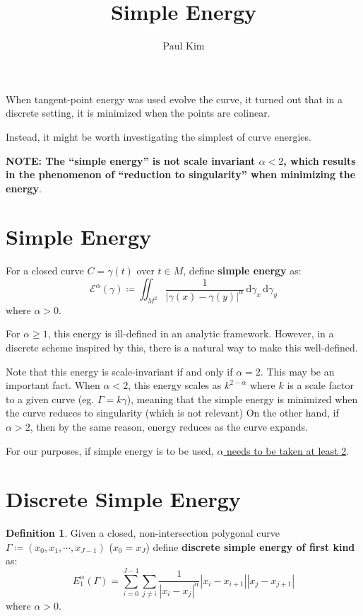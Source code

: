 \documentclass[a4paper]{article}
\title{Simple Energy}
\author{Paul Kim}
\newcommand{\dgamma}{\, \text{d}\gamma}
\theoremstyle{definition}
\newtheorem{definition}{Definition}
\begin{document}
\maketitle
When tangent-point energy was used evolve the curve, it turned out that in a discrete setting,
it is minimized when the points are colinear.

Instead, it might be worth investigating the simplest of curve energies.

\textbf{NOTE: The ``simple energy'' is not scale invariant $\alpha < 2$, which results in the phenomenon of ``reduction to singularity'' when minimizing the energy}.
\section{Simple Energy}
For a closed curve $C = \gamma(t)$ over $t \in M$, define \textbf{simple energy} as:
\begin{equation}
    \mathcal{E}^{\alpha} \left( \gamma \right) \coloneqq \iint_{M^2} \frac{1}{|\gamma(x) - \gamma(y)|^{\alpha}} \dgamma_x \dgamma_y
\end{equation}
where $\alpha > 0$.

For $\alpha \geq 1$, this energy is ill-defined in an analytic framework.
However, in a discrete scheme inspired by this, there is a natural way to make this well-defined.

Note that this energy is scale-invariant if and only if $\alpha = 2$. This may be an important fact.
When $\alpha < 2$, this energy scales as $k^{2-\alpha}$ where $k$ is a scale factor to a given curve (eg. $\Gamma = k \gamma$),
meaning that the simple energy is minimized when the curve reduces to singularity (which is not relevant)
On the other hand, if $\alpha > 2$, then by the same reason, energy reduces as the curve expands.

For our purposes, if simple energy is to be used, \underline{$\alpha$ needs to be taken at least 2}.

\section{Discrete Simple Energy}
\begin{definition}
    Given a closed, non-intersection polygonal curve $\Gamma \coloneqq \left( x_0, x_1, \cdots, x_{J-1} \right)$
    ($x_0 = x_J$)
    define \textbf{discrete simple energy of first kind} as:
    \begin{equation}
        E_{1}^{\alpha}\left( \Gamma \right) = \sum_{i=0}^{J-1} \sum_{j \neq i} \frac{1}{|x_i -x_j|^{\alpha}} |x_i - x_{i+1}| |x_j - x_{j+1}|
    \end{equation}
    where $\alpha > 0$.
\end{definition}
\end{document}
